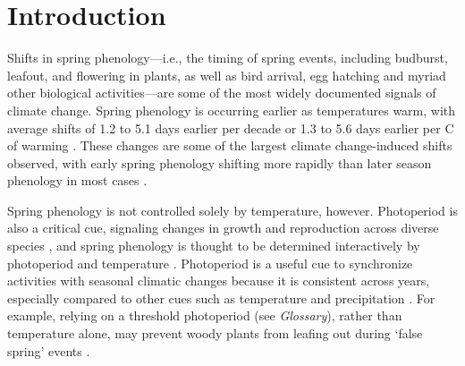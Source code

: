 \documentclass{article}
\begin{document}
\newpage
\section*{Introduction}

\par Shifts in spring phenology---i.e., the timing of spring events, including budburst, leafout, and flowering in plants, as well as bird arrival, egg hatching and myriad other biological activities---are some of the most widely documented signals of climate change. Spring phenology is occurring earlier as temperatures warm, with average shifts of 1.2 to 5.1 days earlier per decade \citep{bradley1999,parmesan2003, poloczanska2013,root2003} or 1.3 to 5.6 days earlier per \degree C of warming \citep{polgar2013,Wolkovich:2012n}. These changes are some of the largest climate change-induced shifts observed, with early spring phenology shifting more rapidly than later season phenology in most cases \citep{bradley1999,menzel2006}. 

\par Spring phenology is not controlled solely by temperature, however. Photoperiod is also a critical cue, signaling changes in growth and reproduction across diverse species \citep[e.g.,][]{flynn2018,lagercrantz2009,bradshaw2007,Howe:1996,solbakken1994}, and spring phenology is thought to be determined interactively by photoperiod and temperature \citep[][see also Box 1]{fu2019}. Photoperiod is a useful cue to synchronize activities with seasonal climatic changes \citep[e.g.,][]{Singh:2017, Basler:2012, Hsu:2011} because it is consistent across years, especially compared to other cues such as temperature and precipitation \citep{saikkonen2012}.  For example, relying on a threshold photoperiod (see \emph{Glossary}), rather than temperature alone, may prevent woody plants from leafing out during `false spring' events \citep[unusually warm periods during winter and early spring that are followed by a return to cold temperatures,][]{gu2008}. %
\end{document}
